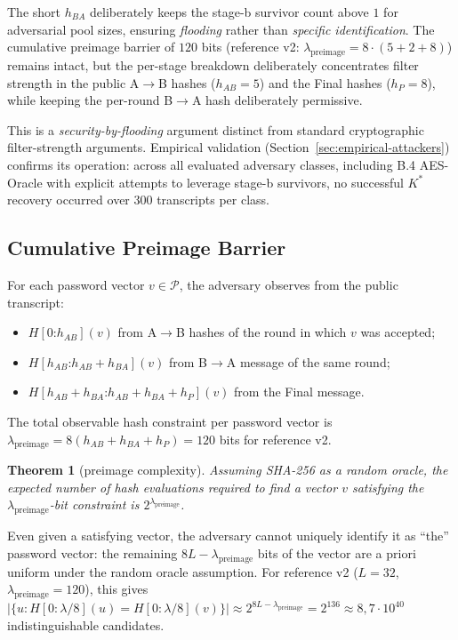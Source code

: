 \documentclass[11pt,a4paper]{article}
\newtheorem{theorem}{Theorem}
\begin{document}
The short $h_{BA}$ deliberately keeps the stage-b survivor count above $1$ for adversarial pool sizes, ensuring \emph{flooding} rather than \emph{specific identification}. The cumulative preimage barrier of $120$ bits (reference v2: $\lambda_{\text{preimage}} = 8 \cdot (5 + 2 + 8)$) remains intact, but the per-stage breakdown deliberately concentrates filter strength in the public A$\to$B hashes ($h_{AB} = 5$) and the Final hashes ($h_P = 8$), while keeping the per-round B$\to$A hash deliberately permissive.

This is a \emph{security-by-flooding} argument distinct from standard cryptographic filter-strength arguments. Empirical validation (Section~\ref{sec:empirical-attackers}) confirms its operation: across all evaluated adversary classes, including B.4 AES-Oracle with explicit attempts to leverage stage-b survivors, no successful $K^*$ recovery occurred over $300$ transcripts per class.

\subsection{Cumulative Preimage Barrier}

For each password vector $v \in \mathcal{P}$, the adversary observes from the public transcript:
\begin{itemize}[leftmargin=*]
\item $H[0\mathord{:}h_{AB}](v)$ from A$\to$B hashes of the round in which $v$ was accepted;
\item $H[h_{AB}\mathord{:}h_{AB}+h_{BA}](v)$ from B$\to$A message of the same round;
\item $H[h_{AB}+h_{BA}\mathord{:}h_{AB}+h_{BA}+h_P](v)$ from the Final message.
\end{itemize}

The total observable hash constraint per password vector is $\lambda_{\text{preimage}} = 8(h_{AB} + h_{BA} + h_P) = 120$ bits for reference v2.

\begin{theorem}[preimage complexity]\label{thm:preimage}
Assuming SHA-256 as a random oracle, the expected number of hash evaluations required to find a vector $v$ satisfying the $\lambda_{\text{preimage}}$-bit constraint is $2^{\lambda_{\text{preimage}}}$.
\end{theorem}

Even given a satisfying vector, the adversary cannot uniquely identify it as ``the'' password vector: the remaining $8L - \lambda_{\text{preimage}}$ bits of the vector are a priori uniform under the random oracle assumption. For reference v2 ($L = 32$, $\lambda_{\text{preimage}} = 120$), this gives $|\{u : H[0{:}\lambda/8](u) = H[0{:}\lambda/8](v)\}| \approx 2^{8L - \lambda_{\text{preimage}}} = 2^{136} \approx 8{,}7 \cdot 10^{40}$ indistinguishable candidates.
\end{document}
